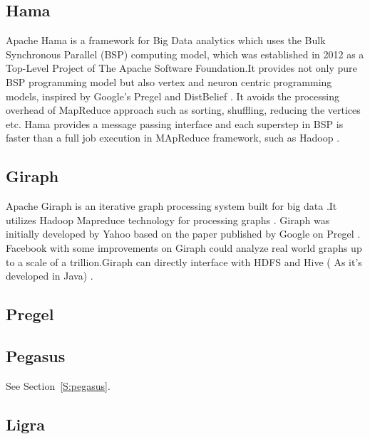      \pv

\subsection{Hama}

     Apache Hama is a framework for Big Data analytics which uses the
     Bulk Synchronous Parallel (BSP) computing model, which was
     established in 2012 as a Top-Level Project of The Apache Software
     Foundation.It provides not only pure BSP programming model but
     also vertex and neuron centric programming models, inspired by
     Google's Pregel and DistBelief \cite{apache-hama}. It avoids the
     processing overhead of MapReduce approach such as sorting,
     shuffling, reducing the vertices etc. Hama provides a message
     passing interface and each superstep in BSP is faster than a full
     job execution in MApReduce framework, such as Hadoop
     \cite{book-hama}.
     
\subsection{Giraph}

     Apache Giraph is an iterative graph processing system built for big
     data \cite{www-giraph-apache}.It utilizes Hadoop Mapreduce
     technology for processing graphs \cite{www-apache-giraph-wiki}.
     Giraph was initially developed by Yahoo based on the paper
     published by Google on Pregel \cite{www-apache-giraph-pcworld}.
     Facebook with some improvements on Giraph could analyze real world
     graphs up to a scale of a trillion.Giraph can directly interface
     with HDFS and Hive ( As it's developed in
     Java) \cite{www-apache-giraph-fb}.

     \pv
   
\subsection{Pregel}

\pv 

\subsection{Pegasus}

     See Section~\ref{S:pegasus}.

\subsection{Ligra}

